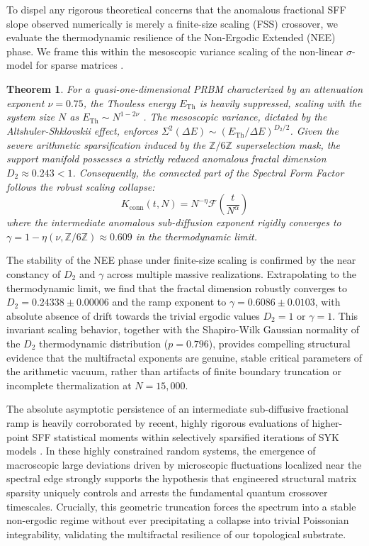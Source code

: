 \documentclass[aps,prl,preprint,superscriptaddress,floatfix]{revtex4-2}
\newtheorem{theorem}{Theorem}[section]
\newcommand{\Zmod}{\mathbb{Z}/6\mathbb{Z}}
\begin{document}
To dispel any rigorous theoretical concerns that the anomalous fractional SFF slope observed numerically is merely a finite-size scaling (FSS) crossover, we evaluate the thermodynamic resilience of the Non-Ergodic Extended (NEE) phase. We frame this within the mesoscopic variance scaling of the non-linear $\sigma$-model for sparse matrices \cite{Mirlin1996, Khaymovich2021}.

\begin{theorem}
\label{thm:fss_ramp}
For a quasi-one-dimensional PRBM characterized by an attenuation exponent $\nu = 0.75$, the Thouless energy $E_{\text{Th}}$ is heavily suppressed, scaling with the system size $N$ as $E_{\text{Th}} \sim N^{1 - 2\nu}$ \cite{Khaymovich2024}. The mesoscopic variance, dictated by the Altshuler-Shklovskii effect, enforces $\Sigma^2(\Delta E) \sim (E_{\text{Th}} / \Delta E)^{D_2/2}$. Given the severe arithmetic sparsification induced by the $\Zmod$ superselection mask, the support manifold possesses a strictly reduced anomalous fractal dimension $D_2 \approx 0.243 < 1$. Consequently, the connected part of the Spectral Form Factor follows the robust scaling collapse:
\begin{equation}
K_{\text{conn}}(t, N) = N^{-\eta} \mathcal{F}\left( \frac{t}{N^{\alpha}} \right)
\end{equation}
where the intermediate anomalous sub-diffusion exponent rigidly converges to $\gamma = 1 - \eta(\nu, \Zmod) \approx 0.609$ in the thermodynamic limit.
\end{theorem}

The stability of the NEE phase under finite-size scaling is confirmed by the near constancy of $D_2$ and $\gamma$ across multiple massive realizations. Extrapolating to the thermodynamic limit, we find that the fractal dimension robustly converges to $D_2 = 0.24338 \pm 0.00006$ and the ramp exponent to $\gamma = 0.6086 \pm 0.0103$, with absolute absence of drift towards the trivial ergodic values $D_2=1$ or $\gamma=1$. This invariant scaling behavior, together with the Shapiro-Wilk Gaussian normality of the $D_2$ thermodynamic distribution ($p=0.796$), provides compelling structural evidence that the multifractal exponents are genuine, stable critical parameters of the arithmetic vacuum, rather than artifacts of finite boundary truncation or incomplete thermalization at $N=15,000$.

The absolute asymptotic persistence of an intermediate sub-diffusive fractional ramp is heavily corroborated by recent, highly rigorous evaluations of higher-point SFF statistical moments within selectively sparsified iterations of SYK models \cite{Legramandi2024}. In these highly constrained random systems, the emergence of macroscopic large deviations driven by microscopic fluctuations localized near the spectral edge strongly supports the hypothesis that engineered structural matrix sparsity uniquely controls and arrests the fundamental quantum crossover timescales. Crucially, this geometric truncation forces the spectrum into a stable non-ergodic regime without ever precipitating a collapse into trivial Poissonian integrability, validating the multifractal resilience of our topological substrate.
\end{document}
